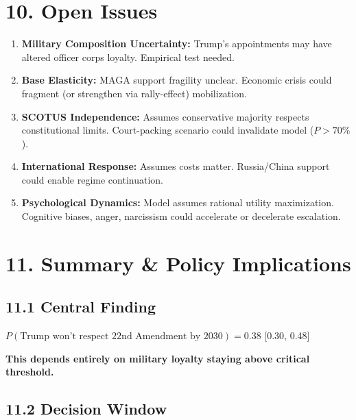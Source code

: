 \documentclass[11pt]{article}
\begin{document}
\section{10. Open Issues}

\begin{enumerate}
\item \textbf{Military Composition Uncertainty:} Trump's appointments may have altered officer corps loyalty. Empirical test needed.

\item \textbf{Base Elasticity:} MAGA support fragility unclear. Economic crisis could fragment (or strengthen via rally-effect) mobilization.

\item \textbf{SCOTUS Independence:} Assumes conservative majority respects constitutional limits. Court-packing scenario could invalidate model ($P > 70\%$).

\item \textbf{International Response:} Assumes costs matter. Russia/China support could enable regime continuation.

\item \textbf{Psychological Dynamics:} Model assumes rational utility maximization. Cognitive biases, anger, narcissism could accelerate or decelerate escalation.
\end{enumerate}

\section{11. Summary \& Policy Implications}

\subsection{11.1 Central Finding}

\begin{fancybox}
\large
$P(\text{Trump won't respect 22nd Amendment by 2030}) = 0.38$ [0.30, 0.48]

\textbf{This depends entirely on military loyalty staying above critical threshold.}
\end{fancybox}

\subsection{11.2 Decision Window}
\end{document}
